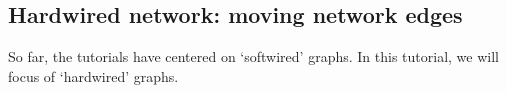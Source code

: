 \documentclass[11pt]{article}
\newcommand{\phyg}{\texttt{PhyG} }
\begin{document}
\begin {enumerate}
%
%
%
%
%

\end{enumerate}
\subsection{Hardwired network: moving network edges}
\label{subsec:hardnetmove}

So far, the tutorials have centered on `softwired' graphs. In this tutorial, we will 
focus of `hardwired' graphs.
\end{document}

